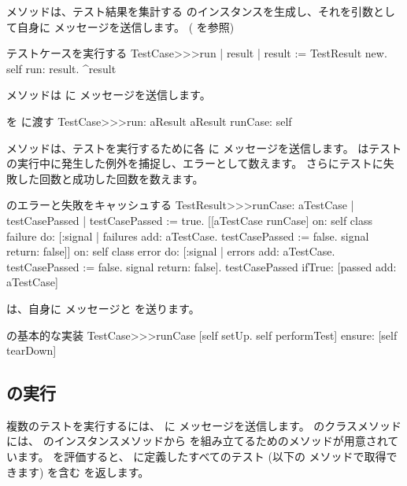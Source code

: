 \documentclass[a4paper,10pt,twoside]{book}
\begin{document}
 メソッドは、テスト結果を集計する  のインスタンスを生成し、それを引数として自身に  メッセージを送信します。
( を参照)

\begin{method}[tastecaserun]{テストケースを実行する}
TestCase>>>run
	| result |
	result := TestResult new.
	self run: result.
	^result
\end{method}

 メソッドは  に  メッセージを送信します。

\begin{method}[testcaserun:]{ を  に渡す}
TestCase>>>run: aResult
	aResult runCase: self
\end{method}

 メソッドは、テストを実行するために各  に  メッセージを送信します。
 はテストの実行中に発生した例外を捕捉し、エラーとして数えます。
さらにテストに失敗した回数と成功した回数を数えます。

\begin{method}[testresultruncase]{ のエラーと失敗をキャッシュする}
TestResult>>>runCase: aTestCase
	| testCasePassed |
	testCasePassed := true.
	[[aTestCase runCase] 
			on: self class failure
			do: 
				[:signal | 
				failures add: aTestCase.
				testCasePassed := false.
				signal return: false]]
					on: self class error
					do:
						[:signal |
						errors add: aTestCase.
						testCasePassed := false.
						signal return: false].
	testCasePassed ifTrue: [passed add: aTestCase]
\end{method}

 は、自身に  メッセージと  を送ります。

\begin{method}[testcaseruncase]{ の基本的な実装}
TestCase>>>runCase
	[self setUp.
	self performTest] ensure: [self tearDown]
\end{method}

\subsection{ の実行}

複数のテストを実行するには、  に  メッセージを送信します。
 のクラスメソッドには、  のインスタンスメソッドから  を組み立てるためのメソッドが用意されています。
 を評価すると、  に定義したすべてのテスト (以下の  メソッドで取得できます) を含む  を返します。
\end{document}
